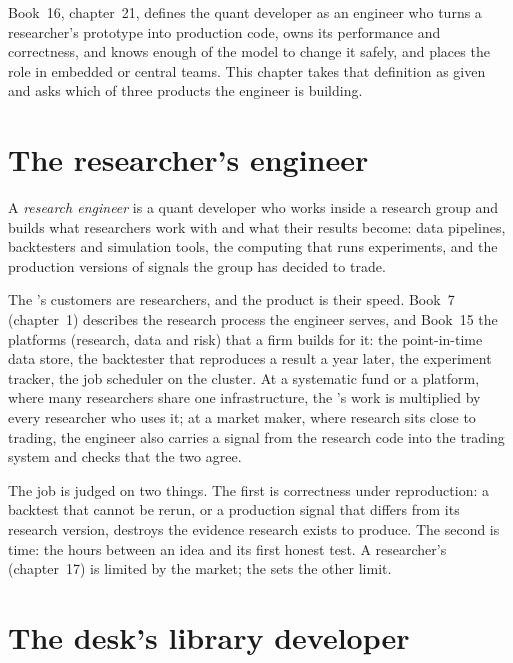 Book~16, chapter~21, defines the quant developer as an engineer who turns a researcher's prototype into production code,
owns its performance and correctness, and knows enough of the model to change it safely, and places the role in embedded
or central teams. This chapter takes that definition as given and asks which of three products the engineer is building.

\section{The researcher's engineer}

\begin{definition}\label{def:in:quant-developer:research}
A \emph{research engineer} is a quant developer who works inside a research group and builds
what researchers work with and what their results become: data pipelines, backtesters and simulation tools, the
computing that runs experiments, and the production versions of signals the group has decided to trade.
\end{definition}

The 's customers are researchers, and the product is their speed. Book~7 (chapter~1) describes the
research process the engineer serves, and Book~15 the platforms (research, data and risk) that a firm builds for it:
the point-in-time data store, the backtester that reproduces a result a year later, the experiment tracker, the job
scheduler on the cluster. At a systematic fund or a platform, where many researchers share one infrastructure, the
's work is multiplied by every researcher who uses it; at a market maker, where research sits close to
trading, the engineer also carries a signal from the research code into the trading system and checks that the two agree.

The job is judged on two things. The first is correctness under reproduction: a backtest that cannot be rerun, or a
production signal that differs from its research version, destroys the evidence research exists to produce. The second
is time: the hours between an idea and its first honest test. A researcher's  (chapter~17) is limited by
the market; the  sets the other limit.

\section{The desk's library developer}

